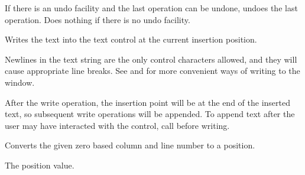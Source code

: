 

\label{wxtextctrlundo}


If there is an undo facility and the last operation can be undone, undoes the last operation. Does nothing
if there is no undo facility.

\label{wxtextctrlwritetext}


Writes the text into the text control at the current insertion position.




Newlines in the text string
are the only control characters allowed, and they will cause appropriate
line breaks.  See  and  for more convenient ways of writing to the window.

After the write operation, the insertion point will be at the end of the inserted text, so subsequent write operations will be appended. To append text after the user may have interacted with the control, call  before writing.

\label{wxtextctrlxytoposition}


Converts the given zero based column and line number to a position.





The position value.

\label{wxtextctrlinsert}



